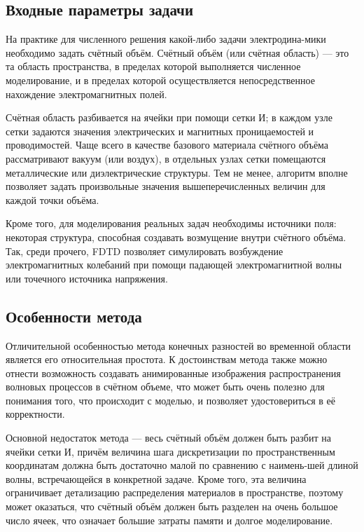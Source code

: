 \subsection{Входные параметры задачи}

На практике для численного решения какой-либо задачи электродина-мики необходимо задать счётный объём. Счётный объём (или счётная область) --- это та область пространства, в пределах которой выполняется численное моделирование, и в пределах которой осуществляется непосредственное нахождение электромагнитных полей.

Счётная область разбивается на ячейки при помощи сетки И; в каждом узле сетки задаются значения электрических и магнитных проницаемостей и проводимостей. Чаще всего в качестве базового материала счётного объёма рассматривают вакуум (или воздух), в отдельных узлах сетки помещаются металлические или диэлектрические структуры. Тем не менее, алгоритм вполне позволяет задать произвольные значения вышеперечисленных величин для каждой точки объёма.

Кроме того, для моделирования реальных задач необходимы источники поля: некоторая структура, способная создавать возмущение внутри счётного объёма. Так, среди прочего, FDTD позволяет симулировать возбуждение электромагнитных колебаний при помощи падающей электромагнитной волны или точечного источника напряжения.

\subsection{Особенности метода}

Отличительной особенностью метода конечных разностей во временной области является его относительная простота. К достоинствам метода также можно отнести возможность создавать анимированные изображения распространения волновых процессов в счётном объеме, что может быть очень полезно для понимания того, что происходит с моделью, и позволяет удостовериться в её корректности.

Основной недостаток метода --- весь счётный объём должен быть разбит на ячейки сетки И, причём величина шага дискретизации по пространственным координатам должна быть достаточно малой по сравнению с наимень-шей длиной волны, встречающейся в конкретной задаче. Кроме того, эта величина ограничивает детализацию распределения материалов в пространстве, поэтому может оказаться, что счётный объём должен быть разделен на очень большое число ячеек, что означает большие затраты памяти и долгое моделирование.

